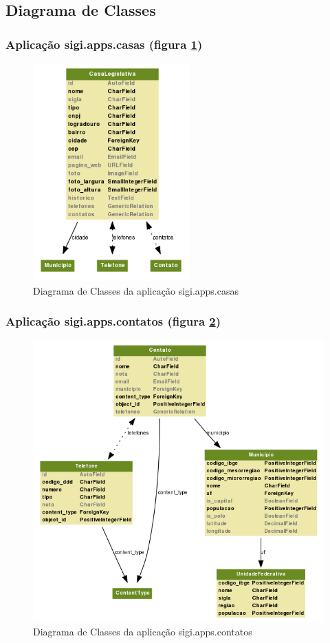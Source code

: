 \subsection{Diagrama de Classes}
\subsubsection{Aplicação sigi.apps.casas (figura \ref{fig:casas})}
\begin{figure}[h]
  \centering
  \includegraphics[width=60mm]{../imagens/casas.png}
  \caption{Diagrama de Classes da aplicação sigi.apps.casas}
  \label{fig:casas}
\end{figure}

\subsubsection{Aplicação sigi.apps.contatos (figura \ref{fig:contatos})}
\begin{figure}[h]
  \centering
  \includegraphics[width=120mm]{../imagens/contatos.png}
  \caption{Diagrama de Classes da aplicação sigi.apps.contatos}
  \label{fig:contatos}
\end{figure}

